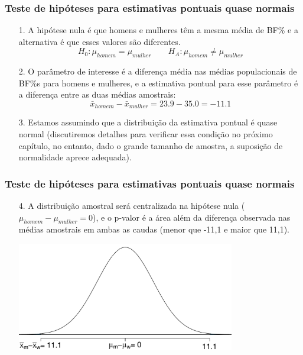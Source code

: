 \begin{frame}
\frametitle{Teste de hipóteses para estimativas pontuais quase normais}

\begin{enumerate}
\justifying
\item[1.] A hipótese nula é que homens e mulheres têm a mesma média de BF\% e a alternativa é que esses valores são diferentes.
\[ H_0: \mu_{homem} = \mu_{mulher} \qquad H_A: \mu_{homem} \ne \mu_{mulher} \]

\pause
\justifying
\item [2.]O parâmetro de interesse é a diferença média nas médias populacionais de BF\%s para homens e mulheres, e a estimativa pontual para esse parâmetro é a diferença entre as duas médias amostrais:
\[ \bar{x}_{homem} - \bar{x}_{mulher} = 23.9 - 35.0 = -11.1 \]

\pause
\justifying
\item[3.] Estamos assumindo que a distribuição da estimativa pontual é quase normal (discutiremos detalhes para verificar essa condição no próximo capítulo, no entanto, dado o grande tamanho de amostra, a suposição de normalidade aprece adequada).

\end{enumerate}


\end{frame}


\begin{frame}
\frametitle{Teste de hipóteses para estimativas pontuais quase normais}

\begin{enumerate}
\justifying
\item[4.] A distribuição amostral será centralizada na hipótese nula ($\mu_{homem} - \mu_{mulher} = 0$), e o p-valor é a área além da diferença observada nas médias amostrais em ambas as caudas (menor que -11,1 e maior que 11,1).

\begin{center}
\includegraphics[width=0.75\textwidth]{4-5_inf_other_est/bf.pdf}
\end{center}


\end{enumerate}

\end{frame}

